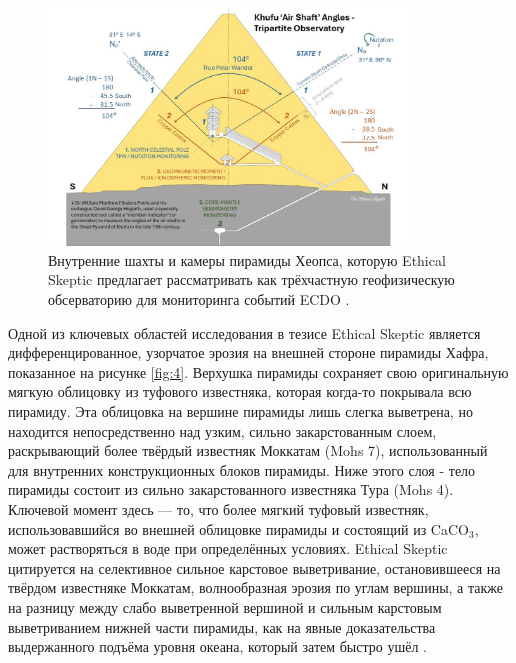 \documentclass[10pt,twocolumn,letterpaper]{article}
\begin{document}
\begin{figure}[b]
\begin{center}
\includegraphics[width=0.85\textwidth]{shafts.jpg}
\end{center}
   \caption{Внутренние шахты и камеры пирамиды Хеопса, которую Ethical Skeptic предлагает рассматривать как трёхчастную геофизическую обсерваторию для мониторинга событий ECDO \cite{28}.}
\label{fig:5}
\end{figure}

Одной из ключевых областей исследования в тезисе Ethical Skeptic является дифференцированное, узорчатое эрозия на внешней стороне пирамиды Хафра, показанное на рисунке \ref{fig:4}. Верхушка пирамиды сохраняет свою оригинальную мягкую облицовку из туфового известняка, которая когда-то покрывала всю пирамиду. Эта облицовка на вершине пирамиды лишь слегка выветрена, но находится непосредственно над узким, сильно закарстованным слоем, раскрывающий более твёрдый известняк Моккатам (Mohs 7), использованный для внутренних конструкционных блоков пирамиды. Ниже этого слоя - тело пирамиды состоит из сильно закарстованного известняка Тура (Mohs 4). Ключевой момент здесь — то, что более мягкий туфовый известняк, использовавшийся во внешней облицовке пирамиды и состоящий из CaCO$_3$, может растворяться в воде при определённых условиях. Ethical Skeptic цитируется на селективное сильное карстовое выветривание, остановившееся на твёрдом известняке Моккатам, волнообразная эрозия по углам вершины, а также на разницу между слабо выветренной вершиной и сильным карстовым выветриванием нижней части пирамиды, как на явные доказательства выдержанного подъёма уровня океана, который затем быстро ушёл \cite{27}.
\end{document}

